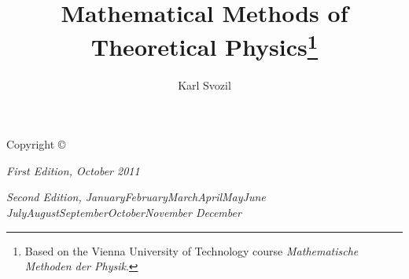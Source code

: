 \documentclass[xcolor=pdftex,dvipsnames,table]{tufte-book}
\title{Mathematical Methods of Theoretical Physics\thanks{Based on the Vienna University of Technology course {\em Mathematische Methoden der Physik}.}}
\author[Karl Svozil]{Karl Svozil}
\newcommand{\monthyear}{%
  \ifcase\month\or January\or February\or March\or April\or May\or June\or
  July\or August\or September\or October\or November\or
  December\fi\space\number\year
}
\begin{document}
\frontmatter


\newpage\thispagestyle{empty}


\maketitle


\newpage
\begin{fullwidth}
 \vfill
\thispagestyle{empty}
\setlength{\parindent}{0pt}
\setlength{\parskip}{\baselineskip}
Copyright \copyright\ \the\year\ \thanklessauthor

\par{}


\par\textit{First Edition, October 2011}
\par\textit{Second Edition, \monthyear}
\end{fullwidth}

\tableofcontents

\listoffigures

\listoftables





\cleardoublepage




\mainmatter


\end{document}
